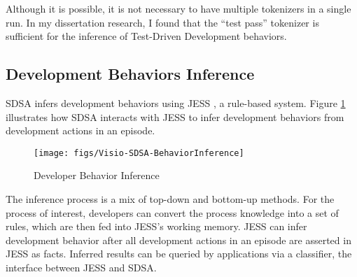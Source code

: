 Although it is possible, it is not necessary to have multiple
tokenizers in a single run. In my dissertation research, I found that 
the ``test pass'' tokenizer is sufficient for the inference of 
Test-Driven Development behaviors.

\subsection{Development Behaviors Inference}
\label{sec:SDSA-Inference}
SDSA infers development behaviors using JESS \cite{Friedman-Hill:03}, 
a rule-based system. Figure \ref{fig:SDSA-Inference} illustrates 
how SDSA interacts with JESS to infer development behaviors from
development actions in an episode. 
\begin{figure}[htbp]
  \centering
  \texttt{[image: figs/Visio-SDSA-BehaviorInference]}
  \caption{Developer Behavior Inference}
  \label{fig:SDSA-Inference}
\end{figure}

The inference process is a mix of top-down and bottom-up 
methods. For the process of interest, developers can convert
the process knowledge into a set of rules, which are then fed 
into JESS's working memory. JESS can infer development behavior 
after all development actions in an episode are asserted in 
JESS as facts. Inferred results can be queried by applications 
via a classifier, the interface between JESS and SDSA.

